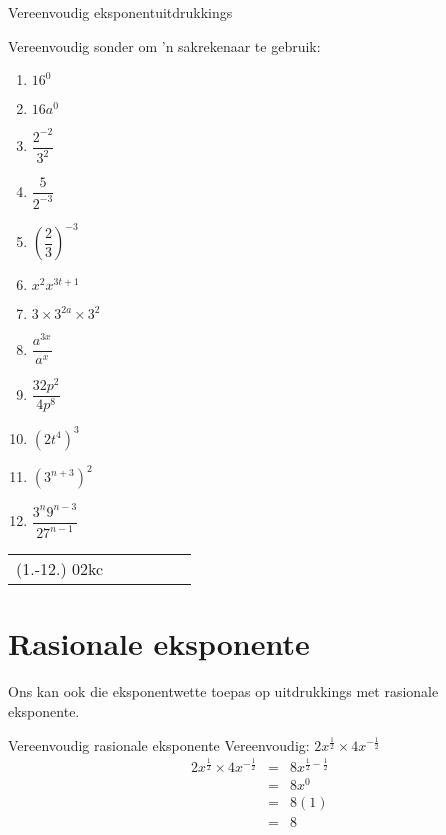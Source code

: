 \begin{exercises}{Vereenvoudig eksponentuitdrukkings}
{
Vereenvoudig sonder om ’n sakrekenaar te gebruik:
\begin{multicols}{2}
\begin{enumerate}[noitemsep, label=\textbf{\arabic*}., itemsep=5pt]
 \item $16^0$
 \item $16a^0$
 \item $\dfrac{2^{-2}}{3^2}$
 \item $ \dfrac{5}{2^{-3}}$
 \item $ \left(\dfrac{2}{3}\right)^{-3} $
 \item $ x^2 x^{3t+1} $
 \item $ 3 \times 3^{2a} \times 3^2$
 \item $ \dfrac{a^{3x}}{a^x} $
 \item $ \dfrac{32p^2}{4p^8}$
 \item $ (2t^4)^3$
 \item $ (3^{n+3})^2$
 \item $ \dfrac{3^n 9^{n-3}}{27^{n-1}}$
\end{enumerate}
\end{multicols}

 
\par \practiceinfo
\par \begin{tabular}[h]{cccccc}
(1.-12.)	02kc	&
\end{tabular}

}
\end{exercises}




\section{Rasionale eksponente}

Ons kan ook die eksponentwette toepas op uitdrukkings met rasionale eksponente.
\par
{}
\clearpage
\begin{wex}{Vereenvoudig rasionale eksponente }
{Vereenvoudig: $2x^{\frac{1}{2}}\times 4x^{-\frac{1}{2}}$}
{
\begin{eqnarray*}
 2x^{\frac{1}{2}} \times 4x^{-\frac{1}{2}} & = & 8x^{\frac{1}{2}-\frac{1}{2}} \\
					  & = & 8x^0 \\
					  & = & 8(1) \\
					  & = & 8 
\end{eqnarray*}
}
\end{wex}


